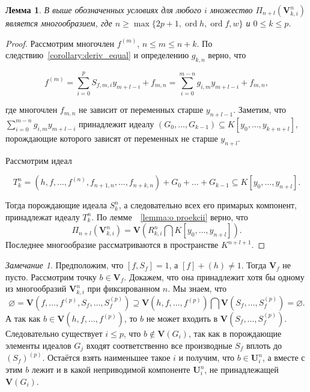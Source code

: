 \documentclass[16pt]{article}
\DeclareMathOperator{\ord}{ord}
\theoremstyle{plain1}
\newtheorem{lemma}[theorem1]{Лемма}
\theoremstyle{plain2}
\theoremstyle{plain}
\theoremstyle{plain3}
\theoremstyle{definition}
\theoremstyle{remark}
\newtheorem{remark}[theorem1]{Замечание}
\begin{document}
\begin{lemma} \label{lemma:o_ideale}
 В выше обозначенных условиях для любого $i$ множество $\Pi_{n+l}(\mathbf{V}_{k,i}^n)$ является многообразием, где $n \geqslant\max\{ 2p+1,\ord{h},\ord{f},w\}$ и  $0\leqslant k\leqslant p$.
\end{lemma}

\begin{proof}
Рассмотрим многочлен $ f^{(m)}$, $n\leqslant m\leqslant n+k$. По следствию~\ref{corollary:deriv_equal} и определению $g_{k,n}$ верно, что

$$
f^{(m)}= \sum\limits_{i=0}^{p} S_{f,m,i}y_{m+l -i} + f_{m,n}=\sum\limits_{i=0}^{m-n} g_{i,m}y_{m+l -i} + f_{m,n},
$$

где многочлен $f_{m,n}$ не зависит от переменных старше $y_{n+l-1}$. Заметим, что $\sum\limits_{i=0}^{m-n} g_{i,m}y_{m+l -i}$ принадлежит идеалу  $(G_0,\ldots, G_{k-1})\subseteq K[y_0,\ldots,y_{k+n+l}]$,  порождающие которого зависят от переменных не старше $y_{n+l}$.

Рассмотрим идеал

$$
T_k^n=(h,f,\ldots,f^{(n)},f_{n+1,n},\ldots,f_{n+k,n}) + G_0+\ldots+ G_{k-1}\subseteq K[y_0,\ldots,y_{n+l}].
$$

Тогда порождающие идеала $S_k^n$, а следовательно всех его примарых компонент, принадлежат идеалу $T_k^n$. По лемме~~\ref{lemma:o proekcii} верно, что
$$
\Pi_{n+l}(\mathbf{V}_{k,i}^n)=\mathbf{V}(R_{k,i}^n\bigcap K[y_0,\ldots,y_{n+l}]).
$$
Последнее многообразие рассматриваются в пространстве $K^{n+l+1}$.
\end{proof}


\begin{remark}\label{remark:o_prinadleznosti_reshenia}
Предположим, что $[f,S_f]=1$, а $[f]+(h)\neq 1$. Тогда $\mathbf{V}_{f}$ не пусто. Рассмотрим точку $b\in\mathbf{V}_{f}$. Докажем, что она принадлежит хотя бы одному из многообразий $\mathbf{V}_{k,i}^n$ при фиксированном $n$. Мы знаем, что 
$$
\varnothing=\mathbf{V}(f,\ldots,f^{(p)},S_f,\ldots,S_f^{(p)})\supseteq \mathbf{V}(h,f,\ldots,f^{(p)})\bigcap\mathbf{V}(S_f,\ldots,S_f^{(p)})=\varnothing.
$$
 А так как $b\in \mathbf{V}(h,f,\ldots,f^{(p)})$, то $b$ не может входить в $\mathbf{V}(S_f,\ldots,S_f^{(p)})$. Следовательно существует $i\leqslant p$, что $b \not\in \mathbf{V}(G_i)$, так как  в порождающие элементы идеалов $G_j$ входят соответственно все производные $S_f$ вплоть до $(S_f)^{(p)}$. Остаётся взять наименьшее такое $i$ и получим, что $b\in \mathbf{U}_{i}^n$, а вместе с этим $b$ лежит и в какой неприводимой компоненте $\mathbf{U}_{i}^n$, не принадлежащей $\mathbf{V}(G_{i})$.
\end{remark}
\end{document}
